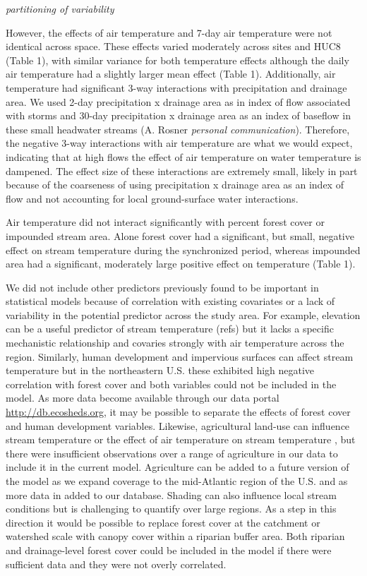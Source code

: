 \documentclass[]{article}
\begin{document}
\emph{partitioning of variability}

However, the effects of air temperature and 7-day air temperature were
not identical across space. These effects varied moderately across sites
and HUC8 (Table 1), with similar variance for both temperature effects
although the daily air temperature had a slightly larger mean effect
(Table 1). Additionally, air temperature had significant 3-way
interactions with precipitation and drainage area. We used 2-day
precipitation x drainage area as in index of flow associated with storms
and 30-day precipitation x drainage area as an index of baseflow in
these small headwater streams (A. Rosner \emph{personal communication}).
Therefore, the negative 3-way interactions with air temperature are what
we would expect, indicating that at high flows the effect of air
temperature on water temperature is dampened. The effect size of these
interactions are extremely small, likely in part because of the
coarseness of using precipitation x drainage area as an index of flow
and not accounting for local ground-surface water interactions.

Air temperature did not interact significantly with percent forest cover
or impounded stream area. Alone forest cover had a significant, but
small, negative effect on stream temperature during the synchronized
period, whereas impounded area had a significant, moderately large
positive effect on temperature (Table 1).

We did not include other predictors previously found to be important in
statistical models because of correlation with existing covariates or a
lack of variability in the potential predictor across the study area.
For example, elevation can be a useful predictor of stream temperature
(refs) but it lacks a specific mechanistic relationship and covaries
strongly with air temperature across the region. Similarly, human
development and impervious surfaces can affect stream temperature but in
the northeastern U.S. these exhibited high negative correlation with
forest cover and both variables could not be included in the model. As
more data become available through our data portal
\url{http://db.ecosheds.org}, it may be possible to separate the effects
of forest cover and human development variables. Likewise, agricultural
land-use can influence stream temperature or the effect of air
temperature on stream temperature \citep{Deweber2014a}, but there were
insufficient observations over a range of agriculture in our data to
include it in the current model. Agriculture can be added to a future
version of the model as we expand coverage to the mid-Atlantic region of
the U.S. and as more data in added to our database. Shading can also
influence local stream conditions but is challenging to quantify over
large regions. As a step in this direction it would be possible to
replace forest cover at the catchment or watershed scale with canopy
cover within a riparian buffer area. Both riparian and drainage-level
forest cover could be included in the model if there were sufficient
data and they were not overly correlated.
\end{document}
